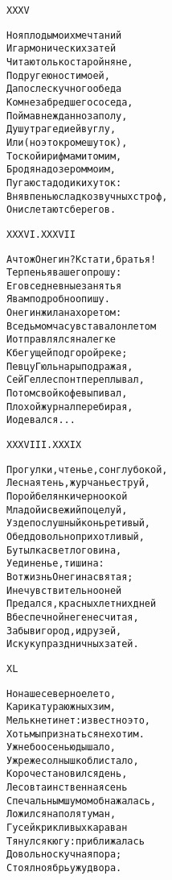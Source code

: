 \begin{minipage}[t]{\dimexpr 0.5\textwidth -\tabcolsep-.5pt}
\begin{alltt}\normalfont\centering
XXXV

Но я плоды моих мечтаний
И гармонических затей
Читаю только старой няне,
Подруге юности моей,
Да после скучного обеда
Ко мне забредшего соседа,
Поймав нежданно за полу,
Душу трагедией в углу,
Или (но это кроме шуток),
Тоской и рифмами томим,
Бродя над озером моим,
Пугаю стадо диких уток:
Вняв пенью сладкозвучных строф,
Они слетают с берегов.
\end{alltt}
\end{minipage}

\begin{minipage}[t]{\dimexpr 0.5\textwidth -\tabcolsep-.5pt}
\begin{alltt}\normalfont\centering
XXXVI. XXXVII

А что ж Онегин? Кстати, братья!
Терпенья вашего прошу:
Его вседневные занятья
Я вам подробно опишу.
Онегин жил анахоретом:
В седьмом часу вставал он летом
И отправлялся налегке
К бегущей под горой реке;
Певцу Гюльнары подражая,
Сей Геллеспонт переплывал,
Потом свой кофе выпивал,
Плохой журнал перебирая,
И одевался...
\end{alltt}
\end{minipage}
\clearpage

\begin{minipage}[t]{\dimexpr 0.5\textwidth -\tabcolsep-.5pt}
\begin{alltt}\normalfont\centering
XXXVIII. XXXIX

Прогулки, чтенье, сон глубокой,
Лесная тень, журчанье струй,
Порой белянки черноокой
Младой и свежий поцелуй,
Узде послушный конь ретивый,
Обед довольно прихотливый,
Бутылка светлого вина,
Уединенье, тишина:
Вот жизнь Онегина святая;
И нечувствительно он ей
Предался, красных летних дней
В беспечной неге не считая,
Забыв и город, и друзей,
И скуку праздничных затей.
\end{alltt}
\end{minipage}

\begin{minipage}[t]{\dimexpr 0.5\textwidth -\tabcolsep-.5pt}
\begin{alltt}\normalfont\centering
XL

Но наше северное лето,
Карикатура южных зим,
Мелькнет и нет: известно это,
Хоть мы признаться не хотим.
Уж небо осенью дышало,
Уж реже солнышко блистало,
Короче становился день,
Лесов таинственная сень
С печальным шумом обнажалась,
Ложился на поля туман,
Гусей крикливых караван
Тянулся к югу: приближалась
Довольно скучная пора;
Стоял ноябрь уж у двора.
\end{alltt}
\end{minipage}
\clearpage

